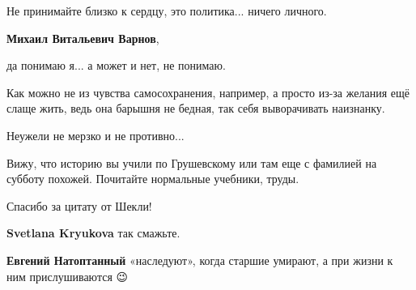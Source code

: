 \begin{itemize}
\begin{itemize}
Не принимайте близко к сердцу, это политика... ничего личного.


 
\textbf{Михаил Витальевич Варнов}, 

да понимаю я... а может и нет, не понимаю.

Как можно не из чувства самосохранения, например, а просто из-за желания ещё
слаще жить, ведь она барышня не бедная, так себя выворачивать наизнанку.

Неужели не мерзко и не противно...

 
Вижу, что историю вы учили по Грушевскому или там еще с фамилией на субботу похожей. Почитайте нормальные учебники, труды.

 
Спасибо за цитату от Шекли!

 
\textbf{Svetlana Kryukova} так смажьте.

 
\textbf{Евгений Натоптанный} «наследуют», когда старшие умирают, а при жизни к ним прислушиваются 😉

 

\end{itemize}
\end{itemize}
